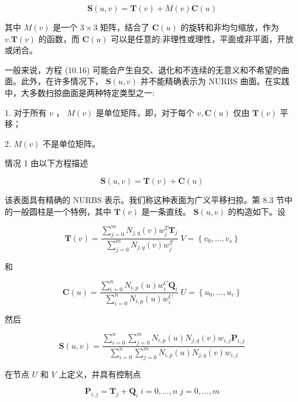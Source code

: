 \documentclass[../main.tex]{subfiles}
\begin{document}
\[
\mathbf{S}\left( {u,v}\right)  = \mathbf{T}\left( v\right)  + M\left( v\right) \mathbf{C}\left( u\right)  \tag{10.16}
\]

其中 \(M\left( v\right)\) 是一个 \(3 \times  3\) 矩阵，结合了 \(\mathbf{C}\left( u\right)\) 的旋转和非均匀缩放，作为 \(v.\mathbf{T}\left( v\right)\) 的函数，而 \(\mathbf{C}\left( u\right)\) 可以是任意的:非理性或理性，平面或非平面，开放或闭合。

一般来说，方程 (10.16) 可能会产生自交、退化和不连续的无意义和不希望的曲面。此外，在许多情况下， \(\mathbf{S}\left( {u,v}\right)\) 并不能精确表示为 NURBS 曲面。在实践中，大多数扫掠曲面是两种特定类型之一:

1. 对于所有 \(v\) ， \(M\left( v\right)\) 是单位矩阵，即，对于每个 \(v,\mathbf{C}\left( u\right)\) 仅由 \(\mathbf{T}\left( v\right)\) 平移；

2. \(M\left( v\right)\) 不是单位矩阵。

情况 1 由以下方程描述

\[
\mathbf{S}\left( {u,v}\right)  = \mathbf{T}\left( v\right)  + \mathbf{C}\left( u\right)  \tag{10.17}
\]

该表面具有精确的 NURBS 表示。我们称这种表面为广义平移扫掠。第 8.3 节中的一般圆柱是一个特例，其中 \(\mathbf{T}\left( v\right)\) 是一条直线。 \(\mathbf{S}\left( {u,v}\right)\) 的构造如下。设

\[
\mathbf{T}\left( v\right)  = \frac{\mathop{\sum }\limits_{{j = 0}}^{m}{N}_{j,q}\left( v\right) {w}_{j}^{T}{\mathbf{T}}_{j}}{\mathop{\sum }\limits_{{j = 0}}^{m}{N}_{j,q}\left( v\right) {w}_{j}^{T}}\;V = \left\{  {{v}_{0},\ldots ,{v}_{s}}\right\}
\]

和

\[
\mathbf{C}\left( u\right)  = \frac{\mathop{\sum }\limits_{{i = 0}}^{n}{N}_{i,p}\left( u\right) {w}_{i}^{C}{\mathbf{Q}}_{i}}{\mathop{\sum }\limits_{{i = 0}}^{n}{N}_{i,p}\left( u\right) {w}_{i}^{C}}\;U = \left\{  {{u}_{0},\ldots ,{u}_{r}}\right\}
\]

然后

\[
\mathbf{S}\left( {u,v}\right)  = \frac{\mathop{\sum }\limits_{{i = 0}}^{n}\mathop{\sum }\limits_{{j = 0}}^{m}{N}_{i,p}\left( u\right) {N}_{j,q}\left( v\right) {w}_{i,j}{\mathbf{P}}_{i,j}}{\mathop{\sum }\limits_{{i = 0}}^{n}\mathop{\sum }\limits_{{j = 0}}^{m}{N}_{i,p}\left( u\right) {N}_{j,q}\left( v\right) {w}_{i,j}}
\]

在节点 \(U\) 和 \(V\) 上定义，并具有控制点

\[
{\mathbf{P}}_{i,j} = {\mathbf{T}}_{j} + {\mathbf{Q}}_{i}\;i = 0,\ldots ,n\;j = 0,\ldots ,m \tag{10.18}
\]
\end{document}
